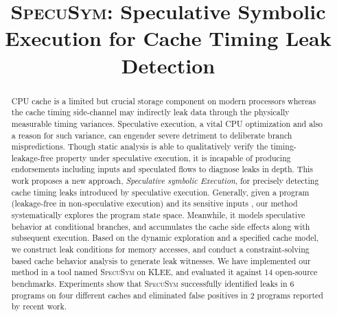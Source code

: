 \documentclass[sigconf]{acmart}
\newcommand{\SpecuSym}{\textsc{SpecuSym} }
\newcommand{\HB}[1]{\textcolor{blue}{Huibo}{\textcolor{red}{#1}}}
\begin{document}
\setlength{\abovedisplayskip}{3pt}
\setlength{\belowdisplayskip}{3pt}

\title[]{\textsc{SpecuSym}: Speculative Symbolic Execution for Cache Timing Leak Detection}


\begin{abstract}
  CPU cache is a limited but crucial storage component on modern processors whereas the 
  cache timing side-channel may indirectly leak data through the physically measurable 
  timing variances. Speculative execution, a vital CPU optimization and also a reason 
  for such variance, can engender severe detriment to deliberate branch mispredictions.
  Though static analysis is able to qualitatively verify the timing-leakage-free 
  property under speculative execution, it is incapable of producing endorsements 
  including inputs and speculated flows to diagnose leaks in depth. 
  This work proposes a new approach, \textit{Speculative symbolic Execution}, for 
  precisely detecting cache timing leaks introduced by speculative execution. 
  Generally, given a program (leakage-free in non-speculative execution) and its 
  sensitive inputs , our method systematically explores the program state space. Meanwhile, 
  it models speculative behavior at conditional branches, and accumulates the cache 
  side effects along with subsequent execution. Based on the dynamic exploration and a 
  specified cache model, we construct leak conditions for memory accesses, and conduct 
  a constraint-solving based cache behavior analysis to generate leak witnesses.
  We have implemented our method in a tool named \SpecuSym on KLEE, and evaluated 
  it against 14 open-source benchmarks. Experiments show that \SpecuSym successfully
  identified leaks in 6 programs on four different caches and eliminated 
  false positives in 2 programs reported by recent work.
\end{abstract}

\maketitle
\end{document}
